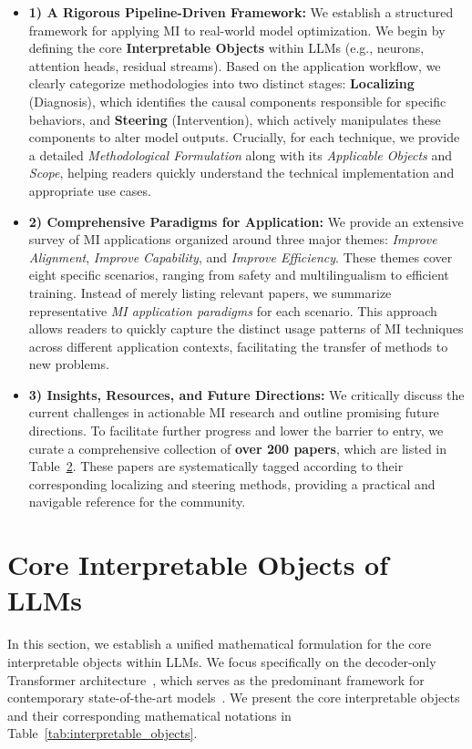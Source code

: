 \documentclass[11pt,letterpaper]{mystyle}
\begin{document}
\begin{itemize}[leftmargin=*]
    \item \textbf{1) A Rigorous Pipeline-Driven Framework:} We establish a structured framework for applying MI to real-world model optimization. We begin by defining the core \textbf{Interpretable Objects} within LLMs (e.g., neurons, attention heads, residual streams). Based on the application workflow, we clearly categorize methodologies into two distinct stages: \textbf{Localizing} (Diagnosis), which identifies the causal components responsible for specific behaviors, and \textbf{Steering} (Intervention), which actively manipulates these components to alter model outputs. Crucially, for each technique, we provide a detailed \textit{Methodological Formulation} along with its \textit{Applicable Objects} and \textit{Scope}, helping readers quickly understand the technical implementation and appropriate use cases.

    \item \textbf{2) Comprehensive Paradigms for Application:} We provide an extensive survey of MI applications organized around three major themes: \textit{Improve Alignment}, \textit{Improve Capability}, and \textit{Improve Efficiency}. These themes cover eight specific scenarios, ranging from safety and multilingualism to efficient training. Instead of merely listing relevant papers, we summarize representative \textit{MI application paradigms} for each scenario. This approach allows readers to quickly capture the distinct usage patterns of MI techniques across different application contexts, facilitating the transfer of methods to new problems.

    \item \textbf{3) Insights, Resources, and Future Directions:} We critically discuss the current challenges in actionable MI research and outline promising future directions. To facilitate further progress and lower the barrier to entry, we curate a comprehensive collection of \textbf{over 200 papers}, which are listed in Table~\hyperlink{paperlistall}{2}. These papers are systematically tagged according to their corresponding localizing and steering methods, providing a practical and navigable reference for the community.
\end{itemize}

\newpage

\section{Core Interpretable Objects of LLMs}
\label{sec:core_objects}
In this section, we establish a unified mathematical formulation for the core interpretable objects within LLMs. We focus specifically on the decoder-only Transformer architecture~\citep{radford2019language}, which serves as the predominant framework for contemporary state-of-the-art models~\citep{dubey2024llama,openai2024gpt4technicalreport,qwen2025qwen25technicalreport}. 
We present the core interpretable objects and their corresponding mathematical notations in Table~\ref{tab:interpretable_objects}.
\end{document}
